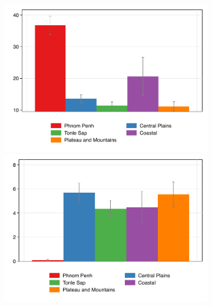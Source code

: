 \documentclass[11pt,letterpaper]{article}
\begin{document}
\begin{figure}[H]
\begin{subfigure}[b]{0.33\linewidth}
		\vspace{-2.5em}
		\newline {}
		\includegraphics[width=1\linewidth]{../../empirical/CSES2017/Appendix/Graphs/region_buildasset} 
		\vspace{-2.5em}
		\newline {}
		\includegraphics[width=1\linewidth]{../../empirical/CSES2017/Appendix/Graphs/region_landasset} 
		\vspace{-2.5em}
		\newline {}

\end{subfigure}
\end{figure}
\end{document}
